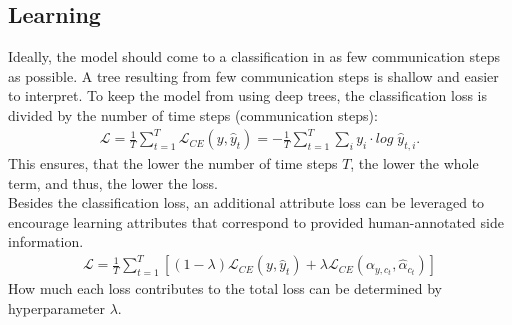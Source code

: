 \documentclass[a4paper,cleardoubleempty,BCOR1cm, 11pt]{report}
\begin{document}
\subsection{Learning}
Ideally, the model should come to a classification in as few communication steps as possible. A tree resulting from few communication steps is shallow and easier to interpret. To keep the model from using deep trees, the classification loss is divided by the number of time steps (communication steps):
\begin{align}
	\mathcal{L} = \frac{1}{T} \sum_{t=1}^{T}\mathcal{L}_{CE}(y, \hat{y}_t) = - \frac{1}{T}\sum_{t=1}^{T}\sum_{i}y_i \cdot log\;\hat{y}_{t,i}.
\end{align}
This ensures, that the lower the number of time steps $T$, the lower the whole term, and thus, the lower the loss.\\
Besides the classification loss, an additional attribute loss can be leveraged to encourage learning attributes that correspond to provided human-annotated side information.
\begin{align}
	\mathcal{L} = \frac{1}{T}\sum_{t=1}^{T}\left[(1-\lambda)\mathcal{L}_{CE}(y,\hat{y}_t) + \lambda \mathcal{L}_{CE}(\alpha_{y,c_t},\hat{\alpha}_{c_t}) \right]
\end{align}
How much each loss contributes to the total loss can be determined by hyperparameter $\lambda$.
\end{document}
